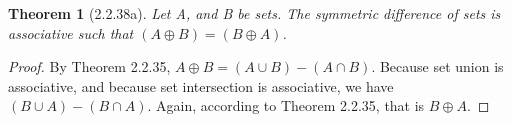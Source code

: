 \documentclass[a4paper, 12pt]{article}
\theoremstyle{plain}
\newtheorem*{theorem*}{Theorem}
\begin{document}
	
	\begin{theorem*}[2.2.38a]
		Let A, and B be sets. The symmetric difference of sets is associative such that $(A \oplus B) = (B \oplus A)$.
	\end{theorem*}
	
	\begin{proof}
		By Theorem 2.2.35, $A \oplus B = (A \cup B) - (A \cap B)$. Because set union is associative, and because set intersection is associative, we have \newline $(B \cup A) - (B \cap A)$. Again, according to Theorem 2.2.35, that is $B \oplus A$.
	\end{proof}
\end{document}
